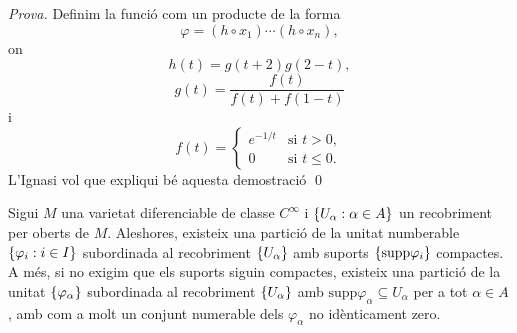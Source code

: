 {\color{green!50!black} 
    \textit{Prova.} 
    Definim la funció com un producte de la forma
    \begin{equation}\label{eq:phi}
        \varphi = (h\circ x_1)\cdots(h\circ x_n),
    \end{equation}
    on
    \begin{equation*}
        h(t) = g(t+2)g(2-t),
    \end{equation*}
    \begin{equation*}
        g(t) = \frac{f(t)}{f(t) + f(1-t)}
    \end{equation*}
    i 
    \begin{equation*}
        f(t) = \begin{cases}
            e^{-1/t} & \text{si } t > 0, \\
            0 & \text{si } t\le 0.
        \end{cases}
    \end{equation*}
    {\color{blue} L'Ignasi vol que expliqui bé aquesta demostració}
    \qed
}

\begin{teo}

    Sigui $M$ una varietat diferenciable de classe $C^\infty$ i $\{U_\alpha:\alpha\in A\}$ un recobriment per oberts de $M$. Aleshores, existeix una partició de la unitat numberable $\{\varphi_i:i\in I\}$ subordinada al recobriment $\{U_\alpha\}$ amb suports $\{\text{supp}\varphi_i\}$ compactes. A més, si no exigim que els suports siguin compactes, existeix una partició de la unitat $\{\varphi_\alpha\}$ subordinada al recobriment $\{U_\alpha\}$ amb $\text{supp}\varphi_\alpha \subseteq U_\alpha$ per a tot $\alpha\in A$, amb com a molt un conjunt numerable dels $\varphi_\alpha$ no idènticament zero.
\end{teo}

